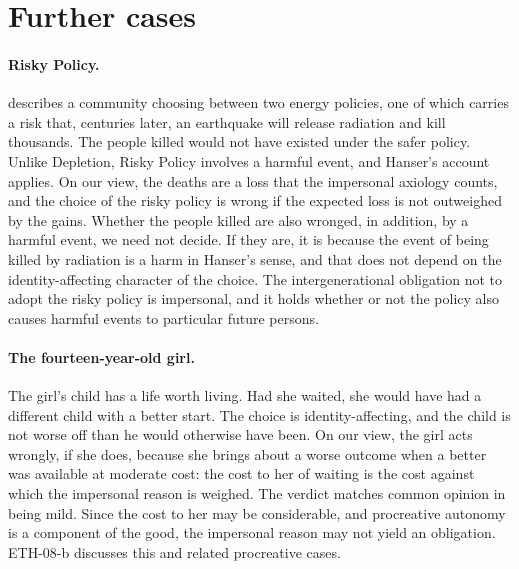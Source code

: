 \documentclass{situationist-preprint}
\begin{document}
\section{Further cases}\label{s:cases}

\paragraph{Risky Policy.} \citet[Part Four]{Parfit1984} describes a community choosing between two energy policies, one of which carries a risk that, centuries later, an earthquake will release radiation and kill thousands. The people killed would not have existed under the safer policy. Unlike Depletion, Risky Policy involves a harmful event, and Hanser's account applies. On our view, the deaths are a loss that the impersonal axiology counts, and the choice of the risky policy is wrong if the expected loss is not outweighed by the gains. Whether the people killed are also wronged, in addition, by a harmful event, we need not decide. If they are, it is because the event of being killed by radiation is a harm in Hanser's sense, and that does not depend on the identity-affecting character of the choice. The intergenerational obligation not to adopt the risky policy is impersonal, and it holds whether or not the policy also causes harmful events to particular future persons.

\paragraph{The fourteen-year-old girl.} The girl's child has a life worth living. Had she waited, she would have had a different child with a better start. The choice is identity-affecting, and the child is not worse off than he would otherwise have been. On our view, the girl acts wrongly, if she does, because she brings about a worse outcome when a better was available at moderate cost: the cost to her of waiting is the cost against which the impersonal reason is weighed. The verdict matches common opinion in being mild. Since the cost to her may be considerable, and procreative autonomy is a component of the good, the impersonal reason may not yield an obligation. ETH-08-b discusses this and related procreative cases.
\end{document}
